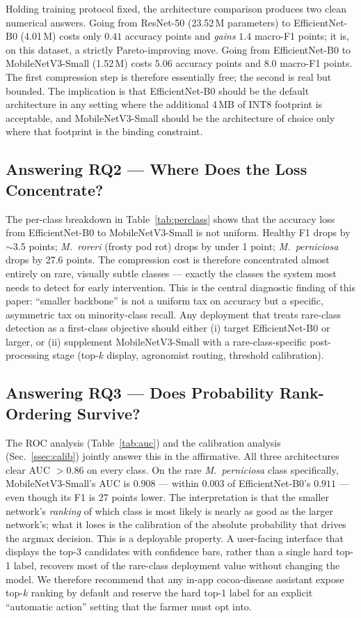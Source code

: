 \documentclass[conference,10pt]{IEEEtran}
\begin{document}
Holding training protocol fixed, the architecture comparison produces two
clean numerical answers. Going from ResNet-50 (23.52\,M parameters) to
EfficientNet-B0 (4.01\,M) costs only $0.41$ accuracy points and \emph{gains}
$1.4$ macro-F1 points; it is, on this dataset, a strictly Pareto-improving
move. Going from EfficientNet-B0 to MobileNetV3-Small (1.52\,M) costs
$5.06$ accuracy points and $8.0$ macro-F1 points. The first compression
step is therefore essentially free; the second is real but bounded.
The implication is that EfficientNet-B0 should be the default architecture
in any setting where the additional 4\,MB of INT8 footprint is acceptable,
and MobileNetV3-Small should be the architecture of choice only where that
footprint is the binding constraint.

\subsection{Answering RQ2 — Where Does the Loss Concentrate?}

The per-class breakdown in Table~\ref{tab:perclass} shows that the
accuracy loss from EfficientNet-B0 to MobileNetV3-Small is not uniform.
Healthy F1 drops by $\sim$3.5 points; \textit{M.\ roreri} (frosty pod rot)
drops by under 1 point; \textit{M.\ perniciosa} drops by 27.6 points.
The compression cost is therefore concentrated almost entirely on rare,
visually subtle classes — exactly the classes the system most needs to
detect for early intervention.
This is the central diagnostic finding of this paper: ``smaller backbone''
is not a uniform tax on accuracy but a specific, asymmetric tax on
minority-class recall. Any deployment that treats rare-class detection as
a first-class objective should either (i) target EfficientNet-B0 or larger,
or (ii) supplement MobileNetV3-Small with a rare-class-specific
post-processing stage (top-$k$ display, agronomist routing, threshold
calibration).

\subsection{Answering RQ3 — Does Probability Rank-Ordering Survive?}

The ROC analysis (Table~\ref{tab:auc}) and the calibration analysis
(Sec.~\ref{ssec:calib}) jointly answer this in the affirmative. All three
architectures clear AUC $> 0.86$ on every class. On the rare
\textit{M.\ perniciosa} class specifically, MobileNetV3-Small's AUC is
$0.908$ — within $0.003$ of EfficientNet-B0's $0.911$ — even though its
F1 is 27 points lower. The interpretation is that the smaller network's
\emph{ranking} of which class is most likely is nearly as good as the
larger network's; what it loses is the calibration of the absolute
probability that drives the argmax decision.
This is a deployable property. A user-facing interface that displays the
top-3 candidates with confidence bars, rather than a single hard top-1
label, recovers most of the rare-class deployment value without changing
the model. We therefore recommend that any in-app cocoa-disease assistant
expose top-$k$ ranking by default and reserve the hard top-1 label for an
explicit ``automatic action'' setting that the farmer must opt into.
\end{document}
